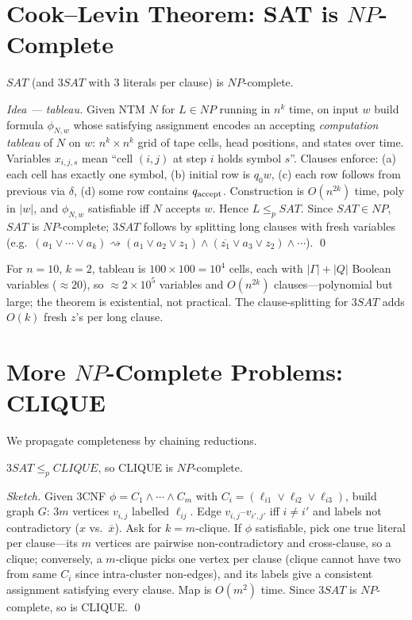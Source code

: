 \section{Cook--Levin Theorem: SAT is $NP$-Complete}
\label{sec:cook-levin}
\begin{theorem}
$SAT$ (and $3SAT$ with $3$ literals per clause) is $NP$-complete.
\end{theorem}
\begin{proof}[Idea --- tableau]
Given NTM $N$ for $L\in NP$ running in $n^k$ time, on input $w$ build formula $\phi_{N,w}$ whose satisfying assignment encodes an accepting \emph{computation tableau} of $N$ on $w$: $n^k\times n^k$ grid of tape cells, head positions, and states over time. Variables $x_{i,j,s}$ mean ``cell $(i,j)$ at step $i$ holds symbol $s$''. Clauses enforce: (a) each cell has exactly one symbol, (b) initial row is $q_0w$, (c) each row follows from previous via $\delta$, (d) some row contains $q_{\rm accept}$. Construction is $O(n^{2k})$ time, poly in $|w|$, and $\phi_{N,w}$ satisfiable iff $N$ accepts $w$. Hence $L\le_p SAT$. Since $SAT\in NP$, $SAT$ is $NP$-complete; $3SAT$ follows by splitting long clauses with fresh variables (e.g.\ $(a_1\lor\cdots\lor a_k)\rightsquigarrow(a_1\lor a_2\lor z_1)\land(\overline{z_1}\lor a_3\lor z_2)\land\cdots$). \qed
\end{proof}

\begin{example}
For $n=10$, $k=2$, tableau is $100\times100=10^4$ cells, each with $|\Gamma|+|Q|$ Boolean variables ($\approx20$), so $\approx2\times10^5$ variables and $O(n^{2k})$ clauses---polynomial but large; the theorem is existential, not practical. The clause-splitting for $3SAT$ adds $O(k)$ fresh $z$'s per long clause.
\end{example}

\section{More $NP$-Complete Problems: CLIQUE}
\label{sec:clique}
We propagate completeness by chaining reductions.

\begin{theorem}
$3SAT\le_p CLIQUE$, so CLIQUE is $NP$-complete.
\end{theorem}
\begin{proof}[Sketch]
Given $3$CNF $\phi=C_1\land\cdots\land C_m$ with $C_i=(\ell_{i1}\lor\ell_{i2}\lor\ell_{i3})$, build graph $G$: $3m$ vertices $v_{i,j}$ labelled $\ell_{ij}$. Edge $v_{i,j}$--$v_{i',j'}$ iff $i\neq i'$ and labels not contradictory ($x$ vs.\ $\overline{x}$). Ask for $k=m$-clique. If $\phi$ satisfiable, pick one true literal per clause---its $m$ vertices are pairwise non-contradictory and cross-clause, so a clique; conversely, a $m$-clique picks one vertex per clause (clique cannot have two from same $C_i$ since intra-cluster non-edges), and its labels give a consistent assignment satisfying every clause. Map is $O(m^2)$ time. Since $3SAT$ is $NP$-complete, so is CLIQUE. \qed
\end{proof}

